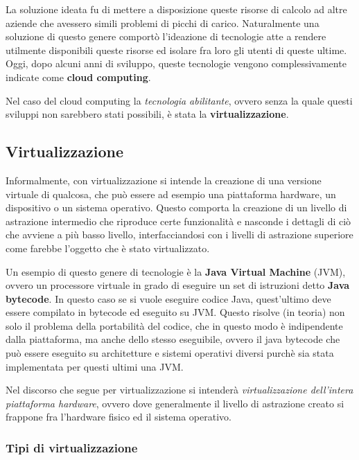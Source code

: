 \documentclass[italian,]{article}
\begin{document}
La soluzione ideata fu di mettere a disposizione queste risorse di
calcolo ad altre aziende che avessero simili problemi di picchi di
carico. Naturalmente una soluzione di questo genere comportò l'ideazione
di tecnologie atte a rendere utilmente disponibili queste risorse ed
isolare fra loro gli utenti di queste ultime. Oggi, dopo alcuni anni di
sviluppo, queste tecnologie vengono complessivamente indicate come
\textbf{cloud computing}.

Nel caso del cloud computing la \emph{tecnologia abilitante}, ovvero
senza la quale questi sviluppi non sarebbero stati possibili, è stata la
\textbf{virtualizzazione}.

\subsection{Virtualizzazione}\label{virtualizzazione}

Informalmente, con virtualizzazione si intende la creazione di una
versione virtuale di qualcosa, che può essere ad esempio una piattaforma
hardware, un dispositivo o un sistema operativo. Questo comporta la
creazione di un livello di astrazione intermedio che riproduce certe
funzionalità e nasconde i dettagli di ciò che avviene a più basso
livello, interfacciandosi con i livelli di astrazione superiore come
farebbe l'oggetto che è stato virtualizzato.

Un esempio di questo genere di tecnologie è la \textbf{Java Virtual
Machine} (JVM), ovvero un processore virtuale in grado di eseguire un
set di istruzioni detto \textbf{Java bytecode}. In questo caso se si
vuole eseguire codice Java, quest'ultimo deve essere compilato in
bytecode ed eseguito su JVM. Questo risolve (in teoria) non solo il
problema della portabilità del codice, che in questo modo è indipendente
dalla piattaforma, ma anche dello stesso eseguibile, ovvero il java
bytecode che può essere eseguito su architetture e sistemi operativi
diversi purchè sia stata implementata per questi ultimi una JVM.

Nel discorso che segue per virtualizzazione si intenderà
\emph{virtualizzazione dell'intera piattaforma hardware}, ovvero dove
generalmente il livello di astrazione creato si frappone fra l'hardware
fisico ed il sistema operativo.

\subsubsection{Tipi di virtualizzazione}\label{tipi-di-virtualizzazione}
\end{document}
